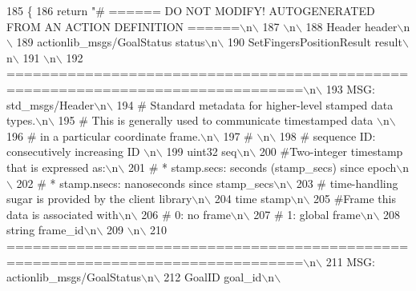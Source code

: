 \begin{DoxyCode}
185   \{
186     \textcolor{keywordflow}{return} \textcolor{stringliteral}{"# ====== DO NOT MODIFY! AUTOGENERATED FROM AN ACTION DEFINITION ======\(\backslash\)n\(\backslash\)}
187 \textcolor{stringliteral}{\(\backslash\)n\(\backslash\)}
188 \textcolor{stringliteral}{Header header\(\backslash\)n\(\backslash\)}
189 \textcolor{stringliteral}{actionlib\_msgs/GoalStatus status\(\backslash\)n\(\backslash\)}
190 \textcolor{stringliteral}{SetFingersPositionResult result\(\backslash\)n\(\backslash\)}
191 \textcolor{stringliteral}{\(\backslash\)n\(\backslash\)}
192 \textcolor{stringliteral}{================================================================================\(\backslash\)n\(\backslash\)}
193 \textcolor{stringliteral}{MSG: std\_msgs/Header\(\backslash\)n\(\backslash\)}
194 \textcolor{stringliteral}{# Standard metadata for higher-level stamped data types.\(\backslash\)n\(\backslash\)}
195 \textcolor{stringliteral}{# This is generally used to communicate timestamped data \(\backslash\)n\(\backslash\)}
196 \textcolor{stringliteral}{# in a particular coordinate frame.\(\backslash\)n\(\backslash\)}
197 \textcolor{stringliteral}{# \(\backslash\)n\(\backslash\)}
198 \textcolor{stringliteral}{# sequence ID: consecutively increasing ID \(\backslash\)n\(\backslash\)}
199 \textcolor{stringliteral}{uint32 seq\(\backslash\)n\(\backslash\)}
200 \textcolor{stringliteral}{#Two-integer timestamp that is expressed as:\(\backslash\)n\(\backslash\)}
201 \textcolor{stringliteral}{# * stamp.secs: seconds (stamp\_secs) since epoch\(\backslash\)n\(\backslash\)}
202 \textcolor{stringliteral}{# * stamp.nsecs: nanoseconds since stamp\_secs\(\backslash\)n\(\backslash\)}
203 \textcolor{stringliteral}{# time-handling sugar is provided by the client library\(\backslash\)n\(\backslash\)}
204 \textcolor{stringliteral}{time stamp\(\backslash\)n\(\backslash\)}
205 \textcolor{stringliteral}{#Frame this data is associated with\(\backslash\)n\(\backslash\)}
206 \textcolor{stringliteral}{# 0: no frame\(\backslash\)n\(\backslash\)}
207 \textcolor{stringliteral}{# 1: global frame\(\backslash\)n\(\backslash\)}
208 \textcolor{stringliteral}{string frame\_id\(\backslash\)n\(\backslash\)}
209 \textcolor{stringliteral}{\(\backslash\)n\(\backslash\)}
210 \textcolor{stringliteral}{================================================================================\(\backslash\)n\(\backslash\)}
211 \textcolor{stringliteral}{MSG: actionlib\_msgs/GoalStatus\(\backslash\)n\(\backslash\)}
212 \textcolor{stringliteral}{GoalID goal\_id\(\backslash\)n\(\backslash\)}

\end{DoxyCode}
